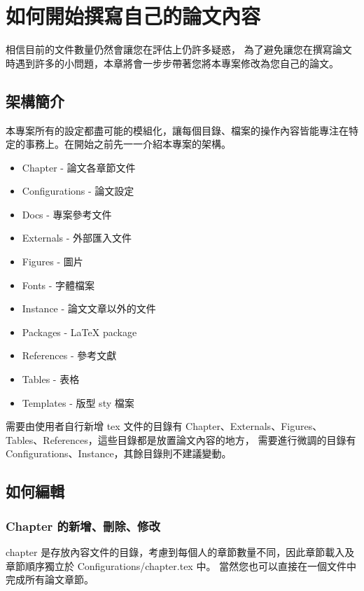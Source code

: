 \chapter{如何開始撰寫自己的論文內容} \label{ch_how2start}

相信目前的文件數量仍然會讓您在評估上仍許多疑惑，
為了避免讓您在撰寫論文時遇到許多的小問題，本章將會一步步帶著您將本專案修改為您自己的論文。

\section{架構簡介}

本專案所有的設定都盡可能的模組化，讓每個目錄、檔案的操作內容皆能專注在特定的事務上。在開始之前先一一介紹本專案的架構。

\begin{itemize}
    \item Chapter - 論文各章節文件
    \item Configurations - 論文設定
    \item Docs - 專案參考文件
    \item Externals - 外部匯入文件
    \item Figures - 圖片
    \item Fonts - 字體檔案
    \item Instance - 論文文章以外的文件
    \item Packages - LaTeX package
    \item References - 參考文獻
    \item Tables - 表格
    \item Templates - 版型 sty 檔案
\end{itemize}

需要由使用者自行新增 tex 文件的目錄有 Chapter、Externals、Figures、Tables、References，這些目錄都是放置論文內容的地方，
需要進行微調的目錄有 Configurations、Instance，其餘目錄則不建議變動。

\section{如何編輯}

\subsection*{Chapter 的新增、刪除、修改}

chapter 是存放內容文件的目錄，考慮到每個人的章節數量不同，因此章節載入及章節順序獨立於 Configurations/chapter.tex 中。
當然您也可以直接在一個文件中完成所有論文章節。

